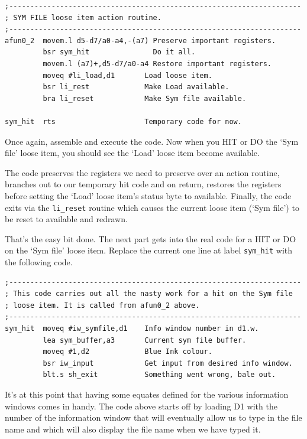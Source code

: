 \begin{lstlisting}[firstnumber=1,]
;---------------------------------------------------------------------
; SYM FILE loose item action routine.
;---------------------------------------------------------------------
afun0_2  movem.l d5-d7/a0-a4,-(a7) Preserve important registers.
         bsr sym_hit               Do it all.
         movem.l (a7)+,d5-d7/a0-a4 Restore important registers.
         moveq #li_load,d1       Load loose item.
         bsr li_rest             Make Load available.
         bra li_reset            Make Sym file available.

sym_hit  rts                     Temporary code for now.
\end{lstlisting}

Once again, assemble and execute the code. Now when you HIT or DO
    the `Sym file' loose item, you should see the `Load' loose item become
    available.

The code preserves the registers we need to preserve over an action
    routine, branches out to our temporary hit code and on return, restores
    the registers before setting the `Load' loose item's status byte to
    available. Finally, the code exits via the \texttt{li\_reset}     
    routine which causes the current loose item (`Sym file') to be reset to
    available and redrawn.

That's the easy bit done. The next part gets into the real code for
    a HIT or DO on the `Sym file' loose item. Replace the current one line at
    label \texttt{sym\_hit} with the following code.

\begin{lstlisting}[firstnumber=1,]
;---------------------------------------------------------------------
; This code carries out all the nasty work for a hit on the Sym file
; loose item. It is called from afun0_2 above.
;---------------------------------------------------------------------
sym_hit  moveq #iw_symfile,d1    Info window number in d1.w.
         lea sym_buffer,a3       Current sym file buffer.
         moveq #1,d2             Blue Ink colour.
         bsr iw_input            Get input from desired info window.
         blt.s sh_exit           Something went wrong, bale out.
\end{lstlisting}

It's at this point that having some equates defined for the various
    information windows comes in handy. The code above starts off by loading
    D1 with the number of the information window that will eventually allow us
    to type in the file name and which will also display the file name when we
    have typed it.

